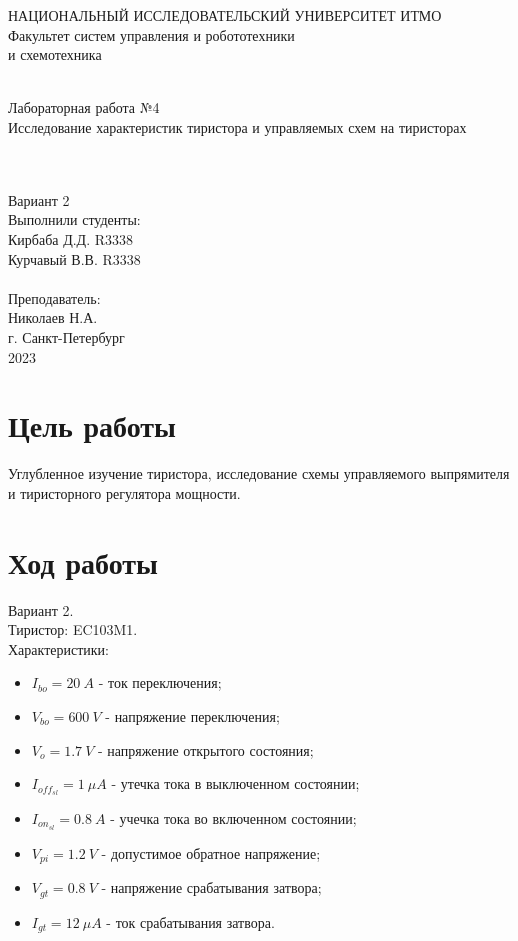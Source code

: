 \documentclass[12pt]{article}
\begin{document}
\begin{titlepage}
\begin{center}
    {\small НАЦИОНАЛЬНЫЙ ИССЛЕДОВАТЕЛЬСКИЙ УНИВЕРСИТЕТ ИТМО} \\
    {\small Факультет систем управления и робототехники} \\
    \vspace*{10\baselineskip}
    { и схемотехника} \\
    \ \\
    \begin{spacing}{1.5}
    {\large Лабораторная работа №4 \\
    Исследование характеристик тиристора и управляемых схем на тиристорах} \\
    \end{spacing} \\
    \ \\
    Вариант 2 \\
    \vspace*{10\baselineskip}
    \hfill {Выполнили студенты:} \\
    \hfill {Кирбаба Д.Д. R3338} \\
    \hfill {Курчавый В.В. R3338} \\
    \ \\
    \hfill {Преподаватель:} \\
    \hfill {Николаев Н.А.} \\
    \mbox{}
    \vfill {г. Санкт-Петербург\\2023}
\end{center}
\end{titlepage}

\section*{Цель работы}
Углубленное изучение тиристора, исследование схемы управляемого выпрямителя и тиристорного регулятора мощности.

\section*{Ход работы}
Вариант 2.\\
Тиристор: EC103M1. \\
Характеристики:
\begin{itemize}
    \item $I_{bo} = 20 \ A$ - ток переключения;
    \item $V_{bo} = 600 \ V$ - напряжение переключения;
    \item $V_{o} = 1.7 \ V$ - напряжение открытого состояния;
    \item $I_{{off}_{sl}} = 1 \ \mu A$ - утечка тока в выключенном состоянии;
    \item $I_{{on}_{sl}} = 0.8 \ A$ - учечка тока во включенном состоянии;
    \item $V_{pi} = 1.2 \ V$ - допустимое обратное напряжение;
    \item $V_{gt} = 0.8 \ V$ - напряжение срабатывания затвора;
    \item $I_{gt} = 12 \ \mu A$ - ток срабатывания затвора.
\end{itemize}
\end{document}
